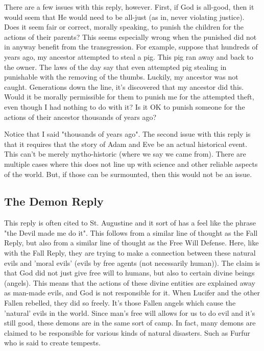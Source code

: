 There are a few issues with this reply, however. First, if God is all-good, then it would seem that He would need to be all-just (as in, never violating justice). Does it seem fair or correct, morally speaking, to punish the children for the actions of their parents? This seems especially wrong when the punished did not in anyway benefit from the transgression. For example, suppose that hundreds of years ago, my ancestor attempted to steal a pig. This pig ran away and back to the owner. The laws of the day say that even attempted pig stealing in punishable with the removing of the thumbs. Luckily, my ancestor was not caught. Generations down the line, it's discovered that my ancestor did this. Would it be morally permissible for them to punish me for the attempted theft, even though I had nothing to do with it? Is it OK to punish someone for the actions of their ancestor thousands of years ago?

Notice that I said "thousands of years ago". The second issue with this reply is that it requires that the story of Adam and Eve be an actual historical event. This can't be merely mytho-historic (where we say we came from). There are multiple cases where this does not line up with science and other reliable aspects of the world. But, if those can be surmounted, then this would not be an issue.
\subsection{The Demon Reply}

This reply is often cited to St. Augustine and it sort of has a feel like the phrase "the Devil made me do it". This follows from a similar line of thought as the Fall Reply, but also from a similar line of thought as the Free Will Defense. Here, like with the Fall Reply, they are trying to make a connection between these natural evils and 'moral evils' (evils by free agents (not necessarily human)). The claim is that God did not just give free will to humans, but also to certain divine beings (angels). This means that the actions of these divine entities are explained away as man-made evils, and God is not responsible for it. When Lucifer and the other Fallen rebelled, they did so freely. It's those Fallen angels which cause the 'natural' evils in the world.  Since man's free will allows for us to do evil and it's still good, these demons are in the same sort of camp. In fact, many demons are claimed to be responsible for various kinds of natural disasters.  Such as Furfur who is said to create tempests.

